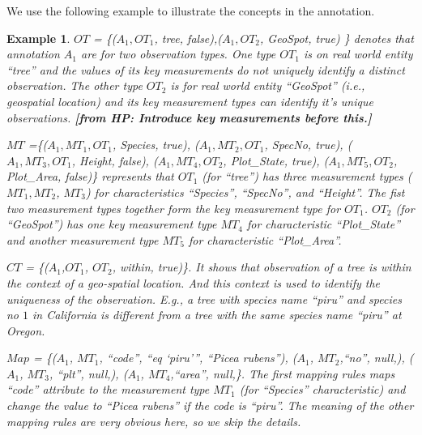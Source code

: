 \documentclass[conference]{IEEEtran}
\newtheorem{example}{\bf Example}[section]
\newcommand{\from}[2]{{\bf[{\sc from #1:} #2]}}
\begin{document}
We use the following example to illustrate the concepts in the
annotation. 



\begin{example}
$OT$ = \{($A_1, OT_1$, tree, false),($A_1, OT_2$, GeoSpot, true) \}
  denotes that annotation $A_1$ are for two observation types. One
  type $OT_1$ is on real world entity ``tree'' and the values of its key measurements
  do not uniquely identify a distinct observation. The other type
  $OT_2$ is for real world entity ``GeoSpot'' (i.e., geospatial
  location) and its key measurement types can identify it's unique
  observations. \from{HP}{Introduce key measurements before this.}

$MT$ =\{($A_1, MT_1, OT_1$, Species, true), 
($A_1, MT_2, OT_1$, SpecNo, true), 
($A_1, MT_3, OT_1$, Height, false),
($A_1, MT_4, OT_2$, Plot\_State, true), 
($A_1, MT_5, OT_2$, Plot\_Area, false)\} represents that $OT_1$
(for ``tree'') has three measurement types ($MT_1, MT_2$, $MT_3$) for characteristics
``Species'', ``SpecNo'', and ``Height''. The fist two measurement
  types together form the key measurement type for $OT_1$. 
$OT_2$ (for ``GeoSpot'') has one key measurement type $MT_4$ for
  characteristic ``Plot\_State'' and another measurement type $MT_5$
  for characteristic ``Plot\_Area''. 

$CT$ = \{($A_1$,$OT_1$, $OT_2$, within, true)\}. It shows that
observation of a {\em tree} is within the context of a geo-spatial
location. And this context is used to identify the uniqueness of the
observation. E.g., a tree with species name ``piru'' and species no
$1$ in California
is different from a tree with 
the same species name ``piru'' at Oregon. 


$Map$ = \{($A_1$, $MT_1$, ``code'', ``eq `piru''', ``Picea rubens''),
($A_1$, $MT_2$,``no'', null,), 
($A_1$, $MT_3$, ``plt'', null,), 
($A_1$, $MT_4$,``area'', null,\}. 
The first mapping rules maps ``code''
attribute to the measurement type $MT_1$ (for ``Species''
characteristic) and change the value to ``Picea rubens'' if the code
is ``piru''. The meaning of the other mapping rules are very
obvious here, so we skip the details. 
\end{example}
\end{document}
